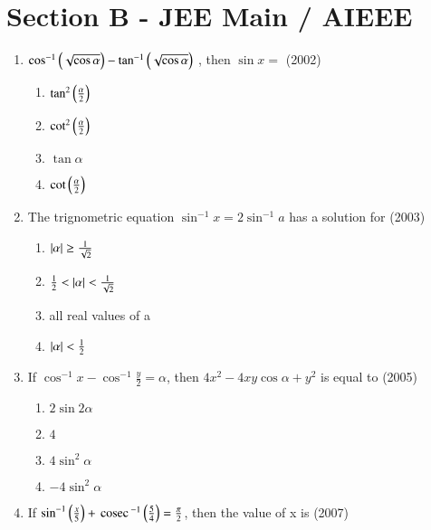 \documentclass[journal,12pt,twocolumn]{IEEEtran}
\theoremstyle{remark}
\begin{document}
\section*{Section B - JEE Main / AIEEE}
\begin{enumerate}
	\item{
			$\cos^{-1}\left(\sqrt{\cos\alpha}\right)-\tan^{-1}\left(\sqrt{\cos\alpha}\right)$ , then $\sin x =$ \hfill (2002)
		\begin{multicols}{2}
		\begin{enumerate}
			\item{$\tan^2 \left(\frac{\alpha}{2}\right)$}
			\item{$\cot^2 \left(\frac{\alpha}{2}\right)$}
			\columnbreak
			\item{$\tan\alpha$}
			\item{$\cot \left(\frac{\alpha}{2}\right)$}
		\end{enumerate}
		\end{multicols}
	}
	\item{
			The trignometric equation $\sin^{-1} x = 2 \sin^{-1}a$ has a solution for \hfill (2003)
		\begin{multicols}{2}
		\begin{enumerate}
			\item{$\left\vert\alpha\right\vert\geq\frac{1}{\sqrt{2}}$}
			\item{$\frac{1}{2} < \left\vert\alpha\right\vert < \frac{1}{\sqrt{2}}$}
			\columnbreak
			\item{all real values of a}
			\item{$\left\vert\alpha\right\vert < \frac{1}{2}$}
		\end{enumerate}
		\end{multicols}
	}
	\item{
			If $\cos^{-1}x - \cos^{-1}\frac{y}{2} = \alpha$, then $4x^2 - 4xy \cos \alpha + y^2$ is equal to \hfill (2005)
		\begin{multicols}{2}
		\begin{enumerate}
			\item{$2 \sin 2\alpha$}
			\item{$4$}
			\columnbreak
			\item{$4 \sin^2 \alpha$}
			\item{$-4 \sin^2 \alpha$}
		\end{enumerate}
		\end{multicols}
	}
	\item{
			If $\sin^{-1} \left(\frac{x}{5}\right) + \,\text{cosec}\,^{-1}\left(\frac{5}{4}\right) = \frac{\pi}{2}$, then the value of x is \hfill (2007)
		\begin{multicols}{2}

\end{multicols}}
\end{enumerate}
\end{document}
